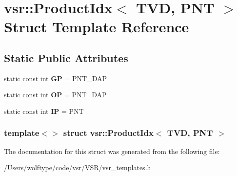 \hypertarget{structvsr_1_1_product_idx_3_01_t_v_d_00_01_p_n_t_01_4}{\section{vsr\-:\-:Product\-Idx$<$ T\-V\-D, P\-N\-T $>$ Struct Template Reference}
\label{structvsr_1_1_product_idx_3_01_t_v_d_00_01_p_n_t_01_4}
}
\subsection*{Static Public Attributes}
\begin{DoxyCompactItemize}
\item 
\hypertarget{structvsr_1_1_product_idx_3_01_t_v_d_00_01_p_n_t_01_4_a83745d09f4b7c28e384f222dff0556e4}{static const int {\bfseries G\-P} = P\-N\-T\-\_\-\-D\-A\-P}\label{structvsr_1_1_product_idx_3_01_t_v_d_00_01_p_n_t_01_4_a83745d09f4b7c28e384f222dff0556e4}

\item 
\hypertarget{structvsr_1_1_product_idx_3_01_t_v_d_00_01_p_n_t_01_4_a3dc61ee2d4cccf77f24480c8d2aca92c}{static const int {\bfseries O\-P} = P\-N\-T\-\_\-\-D\-A\-P}\label{structvsr_1_1_product_idx_3_01_t_v_d_00_01_p_n_t_01_4_a3dc61ee2d4cccf77f24480c8d2aca92c}

\item 
\hypertarget{structvsr_1_1_product_idx_3_01_t_v_d_00_01_p_n_t_01_4_a6535926e764f05f484d42e98508bb118}{static const int {\bfseries I\-P} = P\-N\-T}\label{structvsr_1_1_product_idx_3_01_t_v_d_00_01_p_n_t_01_4_a6535926e764f05f484d42e98508bb118}

\end{DoxyCompactItemize}
\subsubsection*{template$<$$>$ struct vsr\-::\-Product\-Idx$<$ T\-V\-D, P\-N\-T $>$}



The documentation for this struct was generated from the following file\-:\begin{DoxyCompactItemize}
\item 
/\-Users/wolftype/code/vsr/\-V\-S\-R/vsr\-\_\-templates.\-h\end{DoxyCompactItemize}
